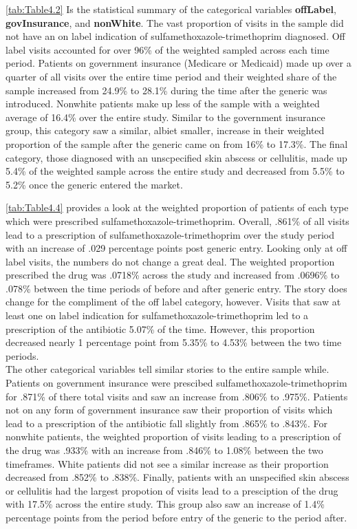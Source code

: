 \begin{landscape}

\end{landscape} 
\indent \autoref{tab:Table4.2} Is the statistical summary of the categorical variables \textbf{offLabel}, \textbf{govInsurance}, and \textbf{nonWhite}. The vast proportion of visits in the sample did not have an on label indication of sulfamethoxazole-trimethoprim diagnosed. Off label visits accounted for over 96\% of the weighted sampled across each time period. Patients on government insurance (Medicare or Medicaid) made up over a quarter of all visits over the entire time period and their weighted share of the sample increased from 24.9\% to 28.1\% during the time after the generic was introduced. Nonwhite patients make up less of the sample with a weighted average of 16.4\% over the entire study. Similar to the government insurance group, this category saw a similar, albiet smaller, increase in their weighted proportion of the sample after the generic came on from 16\% to 17.3\%. The final category, those diagnosed with an unscpecified skin abscess or cellulitis, made up 5.4\% of the weighted sample across the entire study and decreased from 5.5\% to 5.2\% once the generic entered the market.
\begin{landscape}

\end{landscape}
\autoref{tab:Table4.4} provides a look at the weighted proportion of patients of each type which were prescribed sulfamethoxazole-trimethoprim. Overall, .861\% of all visits lead to a prescription of sulfamethoxazole-trimethoprim over the study period with an increase of .029 percentage points post generic entry. Looking only at off label visits, the numbers do not change a great deal. The weighted proportion prescribed the drug was .0718\% across the study and increased from .0696\% to .078\% between the time periods of before and after generic entry. The story does change for the compliment of the off label category, however. Visits that saw at least one on label indication for sulfamethoxazole-trimethoprim led to a prescription of the antibiotic 5.07\% of the time. However, this proportion decreased nearly 1 percentage point from 5.35\% to 4.53\% between the two time periods.\\
\indent The other categorical variables tell similar stories to the entire sample while. Patients on government insurance were prescibed sulfamethoxazole-trimethoprim for .871\% of there total visits and saw an increase from .806\% to .975\%. Patients not on any form of government insurance saw their proportion of visits which lead to a prescription of the antibiotic fall slightly from .865\% to .843\%. For nonwhite patients, the weighted proportion of visits leading to a prescription of the drug was .933\% with an increase from .846\% to 1.08\% between the two timeframes. White patients did not see a similar increase as their proportion decreased from .852\% to .838\%. Finally, patients with an unspecified skin abscess or cellulitis had the largest propotion of visits lead to a presciption of the drug with 17.5\% across the entire study. This group also saw an increase of 1.4\% percentage points from the period before entry of the generic to the period after. 
\begin{landscape}

\end{landscape}